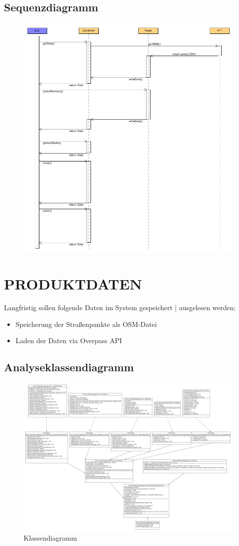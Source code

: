 	\subsection{Sequenzdiagramm}
	\begin{figure}[H]
	\centering
	\includegraphics[width=0.7\linewidth]{images/Squenz}
	\caption{}
	\label{fig:Seq}
	\end{figure}
	
	
	\section{\Large PRODUKTDATEN}
		Langfristig sollen folgende Daten im System gespeichert | ausgelesen werden:
	\begin{itemize}
		\item Speicherung der Straßenpunkte als OSM-Datei
		\item Laden der Daten via Overpass API
	\end{itemize}
	\subsection{Analyseklassendiagramm}	
		\begin{figure}[H]
		\centering
		\includegraphics[width=0.7\linewidth]{images/Klassendiagramm}
		\caption{Klassendiagramm}
		\label{fig:Klassendiagramm}
	\end{figure}
